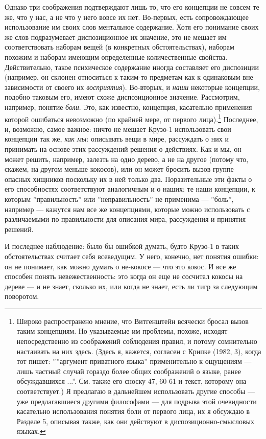 \documentclass[11pt]{book}
\begin{document}
Однако три соображения подтверждают лишь то, что его концепции не совсем те же, что у нас, а не что у него вовсе их нет. Во-первых, есть сопровождающее использование им своих слов ментальное содержание. Хотя его понимание своих же слов подразумевает диспозиционное их значение, это не мешает им соответствовать наборам вещей (в конкретных обстоятельствах), наборам похожим и наборам имеющим определенные количественные свойства. Действительно, такое психическое содержание иногда составляет его диспозиции (например, он склонен относиться к таким-то предметам как к одинаковым вне зависимости от своего их \textit{восприятия}). Во-вторых, и \textit{наши} некоторые концепции, подобно таковым его, имеют схоже диспозиционное значение. Рассмотрим, например, понятие \textit{боли}. Это, как известно, концепция, касательно применения которой ошибаться невозможно (по крайней мере, от первого лица).\footnote{Широко распространено мнение, что Витгенштейн всячески бросал вызов таким концепциям. Но указываемые им проблемы, похоже, исходят непосредственно из соображений соблюдения правил, и потому сомнительно настаивать на них здесь. (Здесь я, кажется, согласен с Крипке (1982, 3), когда тот пишет: ''''аргумент приватного языка'' применительно к ощущениям --- лишь частный случай гораздо более общих соображений о языке, ранее обсуждавшихся ...''. См. также его сноску 47, 60-61 и текст, которому она соответствует.) Я предлагаю в дальнейшем использовать другие способы --- уже предлагавшиеся другими философами --- для подрыва этой очевидности касательно использования понятия боли от первого лица, их я обсуждаю в Разделе 5, описывая также, как они действуют в диспозиционно-смысловых языках.} Последнее, и, возможно, самое важное: ничто не мешает Крузо-1 использовать свои концепции так же, \textit{как мы}: описывать вещи в мире, рассуждать о них и принимать на основе этих рассуждений решения о действиях. Как и мы, он может решить, например, залезть на одно дерево, а не на другое (потому что, скажем, на другом меньше кокосов), или он может бросить вызов группе опасных хищников поскольку их в ней только два. Поразительные эти факты о его способностях соответствуют аналогичным и о наших: те наши концепции, к которым ''правильность'' или ''неправильность'' не применима --- ''боль'', например --- кажутся нам все же концепциями, которые можно использовать с различаемыми по правильности для описания мира, рассуждения и принятия решений.

И последнее наблюдение: было бы ошибкой думать, будто Крузо-1 в таких обстоятельствах считает себя всеведущим. У него, конечно, нет понятия ошибки: он не понимает, как можно думать о не-кокосе --- что это кокос. И все же способен понять невежественность: это когда он еще не сосчитал кокосы на дереве --- и не знает, сколько их, или когда не знает, есть ли тигр за следующим поворотом.
\end{document}
